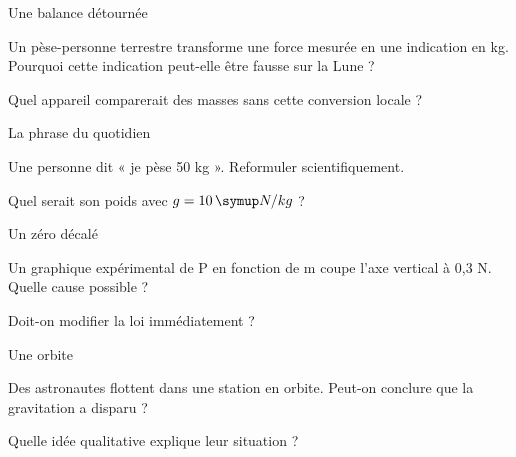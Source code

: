\par\noindent\begin{minipage}{\linewidth}
\begin{exercice}[3]{Une balance détournée}
\begin{questions}
\item Un pèse-personne terrestre transforme une force mesurée en une indication en kg. Pourquoi cette indication peut-elle être fausse sur la Lune ?
\item Quel appareil comparerait des masses sans cette conversion locale ?
\end{questions}
\end{exercice}
\end{minipage}
\par\noindent\begin{minipage}{\linewidth}
\begin{exercice}[3]{La phrase du quotidien}
\begin{questions}
\item Une personne dit « je pèse 50 kg ». Reformuler scientifiquement.
\item Quel serait son poids avec $g=10\unite{N/kg}$ ?
\end{questions}
\end{exercice}
\end{minipage}
\par\noindent\begin{minipage}{\linewidth}
\begin{exercice}[3]{Un zéro décalé}
\begin{questions}
\item Un graphique expérimental de P en fonction de m coupe l’axe vertical à 0,3 N. Quelle cause possible ?
\item Doit-on modifier la loi immédiatement ?
\end{questions}
\end{exercice}
\end{minipage}
\par\noindent\begin{minipage}{\linewidth}
\begin{exercice}[3]{Une orbite}
\begin{questions}
\item Des astronautes flottent dans une station en orbite. Peut-on conclure que la gravitation a disparu ?
\item Quelle idée qualitative explique leur situation ?
\end{questions}
\end{exercice}
\end{minipage}
